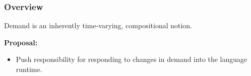 \begin{frame}
\frametitle{Overview}

Demand is an inherently time-varying, compositional notion.

\vspace{7pt}
\pause
\textbf{Proposal:}
\begin{itemize}
\item Push responsibility for responding to changes in demand into the language runtime.
\end{itemize}
\end{frame}
